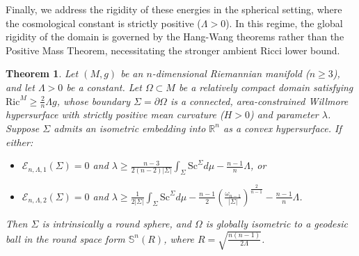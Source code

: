 \documentclass[12pt,a4paper]{amsart}
\theoremstyle{plain}
\newtheorem{theorem}{Theorem}[section]
\theoremstyle{definition}
\begin{document}
 Finally, we address the rigidity of these energies in the spherical setting, where the cosmological constant is strictly positive ($\Lambda > 0$). In this regime, the global rigidity of the domain is governed by the Hang-Wang theorems rather than the Positive Mass Theorem, necessitating the stronger ambient Ricci lower bound.
\begin{theorem}\label{thm:rigidityhighsphdim}
Let $(M,g)$ be an $n$-dimensional Riemannian manifold ($n\geq 3$), and let $\Lambda > 0$ be a constant. Let $\Omega \subset M$ be a relatively compact domain satisfying $\mathrm{Ric}^M \ge \frac{2}{n}\Lambda g$, whose boundary $\Sigma = \partial\Omega$ is a connected, area-constrained Willmore hypersurface with strictly positive mean curvature ($H > 0$) and parameter $\lambda$. Suppose $\Sigma$ admits an isometric embedding into $\mathbb{R}^n$ as a convex hypersurface. If either:
\begin{itemize}
    \item[$i)$] $\mathcal{E}_{n,\Lambda,1}(\Sigma)=0$ and $ \lambda \geq \frac{n-3}{2(n-2)|\Sigma|} \int_{\Sigma} \mathrm{Sc}^{\Sigma} d\mu - \frac{n-1}{n}\Lambda$, or
    \item[$ii)$] $\mathcal{E}_{n,\Lambda,2}(\Sigma)= 0$ and $
        \lambda \geq \frac{1}{2|\Sigma|}\int_{\Sigma} \mathrm{Sc}^{\Sigma} d\mu - \frac{n-1}{2} \left( \frac{\omega_{n-1}}{ |\Sigma|} \right)^{\frac{2}{n-1}} - \frac{n-1}{n}\Lambda$.
\end{itemize}
Then $\Sigma$ is intrinsically a round sphere, and $\Omega$ is globally isometric to a  geodesic ball in the round space form $\mathbb{S}^n(R)$, where $R = \sqrt{\frac{n(n-1)}{2\Lambda}}$.
\end{theorem}
\end{document}
